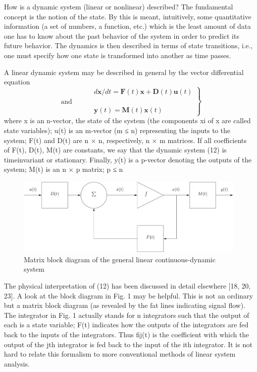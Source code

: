 \documentclass{article}
\begin{document}
How is a dynamic system (linear or nonlinear) described? The
fundamental concept is the notion of the state. By this is meant,
intuitively, some quantitative information (a set of numbers, a
function, etc.) which is the least amount of data one has to know
about the past behavior of the system in order to predict its future
behavior. The dynamics is then described in terms of state
transitions, i.e., one must specify how one state is transformed
into another as time passes.

A linear dynamic system may be described in general by the
vector differential equation
\begin{equation}
\label{eq12}
\left.\begin{aligned}
&d\mathbf{x}/dt=\mathbf{F}(t)\mathbf{x}+\mathbf{D}(t)\mathbf{u}(t)\\
\text{ and }\qquad&\\
&\mathbf{y}(t)=\mathbf{M}(t)\mathbf{x}(t)
\end{aligned}\right\}
\end{equation}
where x is an n-vector, the state of the system (the components xi
of x are called state variables); u(t) is an m-vector (m ≤ n)
representing the inputs to the system; F(t) and D(t) are n × n,
respectively, n × m matrices. If all coefficients of F(t), D(t), M(t)
are constants, we say that the dynamic system (12) is timeinvariant
or stationary. Finally, y(t) is a p-vector denoting the
outputs of the system; M(t) is an n × p matrix; p ≤ n

\begin{figure}[htbp]
\centering
\includegraphics[width=0.5\paperwidth]{fig/fg1.pdf}
\caption{Matrix block diagram of the general linear continuous-dynamic system}
\label{fg1}
\end{figure}

The physical interpretation of (12) has been discussed in detail
elsewhere [18, 20, 23]. A look at the block diagram in Fig. 1 may
be helpful. This is not an ordinary but a matrix block diagram (as
revealed by the fat lines indicating signal flow). The integrator in Fig. 1 actually stands for n integrators such that the output of
each is a state variable; F(t) indicates how the outputs of the
integrators are fed back to the inputs of the integrators. Thus fij(t)
is the coefficient with which the output of the jth integrator is fed
back to the input of the ith integrator. It is not hard to relate this
formalism to more conventional methods of linear system
analysis.
\end{document}
